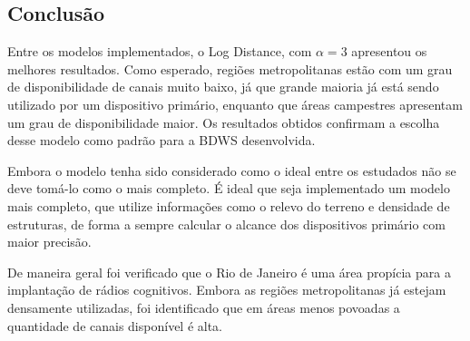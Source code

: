 \subsection{Conclusão}

Entre os modelos implementados, o Log Distance, com \begin{math}\alpha=3 \end{math} apresentou os melhores resultados. Como esperado, regiões metropolitanas estão com um grau de disponibilidade de canais muito baixo, já que grande maioria já está sendo utilizado por um dispositivo primário, enquanto que áreas campestres apresentam um grau de disponibilidade maior. Os resultados obtidos confirmam a escolha desse modelo como padrão para a BDWS desenvolvida.

Embora o modelo tenha sido considerado como o ideal entre os estudados não se deve tomá-lo como o mais completo. É ideal que seja implementado um modelo mais completo, que utilize informações como o relevo do terreno e densidade de estruturas, de forma a sempre calcular o alcance dos dispositivos primário com maior precisão.

De maneira geral foi verificado que o Rio de Janeiro é uma área propícia para a implantação de rádios cognitivos. Embora as regiões metropolitanas já estejam densamente utilizadas, foi identificado que em áreas menos povoadas a quantidade de canais disponível é alta.
